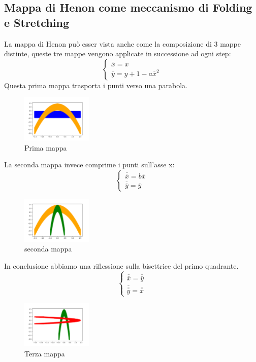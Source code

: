 \subsection{Mappa di Henon come meccanismo di Folding e Stretching}%
\label{sub:Mappa di Henon come meccanismo di Folding e Stretching}
La mappa di Henon può esser vista anche come la composizione di 3 mappe distinte, queste tre mappe vengono applicate in successione ad ogni step:
\[
    \begin{cases}
        \overline{x} = x\\
	\overline{y} = y + 1 - a\overline{x}^2
    \end{cases}
\] 
Questa prima mappa trasporta i punti verso una parabola.
\begin{figure}[H]
    \centering
    \includegraphics[width=0.3\textwidth]{figures/22_step1henon.png}
    \caption{\scriptsize Prima mappa}
    \label{fig:figures-22_step1henon-png}
\end{figure}
\noindent
La seconda mappa invece comprime i punti sull'asse x:
\[
    \begin{cases}
        \overline{\overline{x}} = b\overline{x}\\
	\overline{\overline{y}} = \overline{y}
    \end{cases}
\] 
\begin{figure}[H]
    \centering
    \includegraphics[width=0.3\textwidth]{figures/22_step2henon.png}
    \caption{\scriptsize seconda mappa}
    \label{fig:figures-22_step1henon-png}
\end{figure}
\noindent
In conclusione abbiamo una riflessione sulla bisettrice del primo quadrante.
\[
    \begin{cases}
        \overline{\overline{\overline{x}}} = \overline{\overline{y}}\\
	\overline{\overline{\overline{y}}} = \overline{\overline{x}}
    \end{cases}
\] 
\begin{figure}[H]
    \centering
    \includegraphics[width=0.3\textwidth]{figures/22_step3henon.png}
    \caption{\scriptsize Terza mappa}
    \label{fig:figures-22_step1henon-png}
\end{figure}
\noindent
\clearpage

